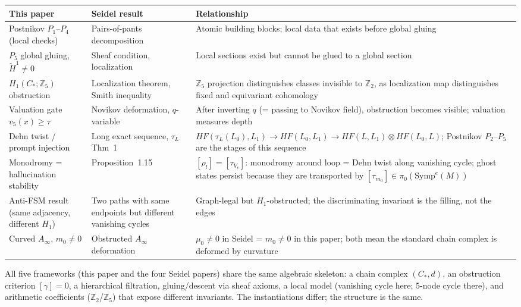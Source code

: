 \documentclass[11pt,a4paper]{article}
\begin{document}
\begin{center}
\renewcommand{\arraystretch}{1.3}\small
\begin{tabularx}{\linewidth}{p{3.2cm}p{3.5cm}X}
\toprule
\textbf{This paper} & \textbf{Seidel result} & \textbf{Relationship} \\
\midrule
Postnikov $P_1$--$P_4$ (local checks) &
  Pairs-of-pants decomposition \cite{seidel2012pants} &
  Atomic building blocks; local data that exists before global gluing \\
$P_5$ global gluing, $\check{H}^1 \neq 0$ &
  Sheaf condition, localization \cite{seidel2010localization} &
  Local sections exist but cannot be glued to a global section \\
$H_1(C_*;\mathbb{Z}_5)$ obstruction &
  Localization theorem, Smith inequality \cite{seidel2010localization} &
  $\mathbb{Z}_5$ projection distinguishes classes invisible to $\mathbb{Z}_2$,
  as localization map distinguishes fixed and equivariant cohomology \\
Valuation gate $v_5(x) \geq \tau$ &
  Novikov deformation, $q$-variable \cite{seidel2002deformations} &
  After inverting $q$ (= passing to Novikov field),
  obstruction becomes visible; valuation measures depth \\
Dehn twist / prompt injection &
  Long exact sequence, $\tau_L$ \cite{seidel2003long} Thm~1 &
  $HF(\tau_L(L_0),L_1)\to HF(L_0,L_1)\to HF(L,L_1)\otimes HF(L_0,L)$;
  Postnikov $P_2$--$P_5$ are the stages of this sequence \\
Monodromy = hallucination stability &
  Proposition~1.15 \cite{seidel2003long} &
  $[\rho_l]=[\tau_{V_c}]$: monodromy around loop = Dehn twist
  along vanishing cycle; ghost states persist because they
  are transported by $[\tau_{m_0}] \in \pi_0(\mathrm{Symp}^e(M))$ \\
Anti-FSM result (same adjacency, different $H_1$) &
  Two paths with same endpoints but different vanishing cycles &
  Graph-legal but $H_1$-obstructed; the discriminating invariant
  is the filling, not the edges \\
Curved $A_\infty$, $m_0 \neq 0$ &
  Obstructed $A_\infty$ deformation \cite{seidel2002deformations} &
  $\mu_0 \neq 0$ in Seidel = $m_0 \neq 0$ in this paper;
  both mean the standard chain complex is deformed by curvature \\
\bottomrule
\end{tabularx}
\end{center}

\noindent
All five frameworks (this paper and the four Seidel papers) share
the same algebraic skeleton: a chain complex $(C_*,d)$, an
obstruction criterion $[\gamma]=0$, a hierarchical filtration,
gluing/descent via sheaf axioms, a local model (vanishing cycle
here; 5-node cycle there), and arithmetic coefficients
($\mathbb{Z}_2$/$\mathbb{Z}_5$) that expose different invariants.
The instantiations differ; the structure is the same.
\end{document}

